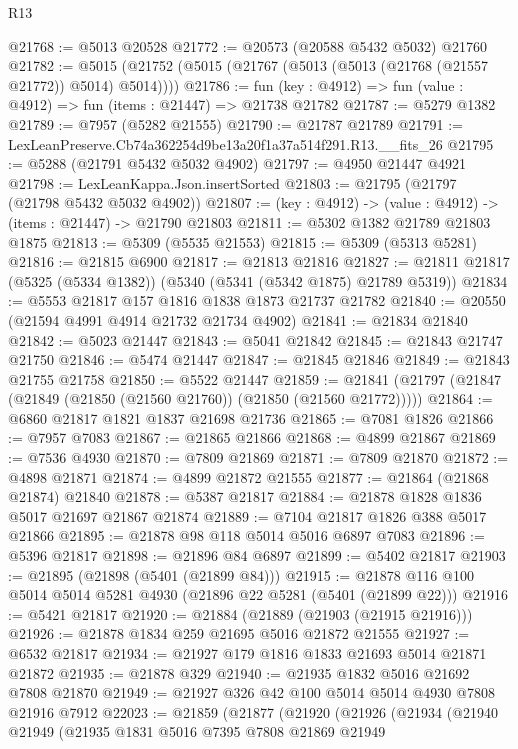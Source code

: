\begin{lexlean}{R13}
\begin{coremodule}
@21768 := @5013 @20528
@21772 := @20573 (@20588 @5432 @5032) @21760
@21782 := @5015 (@21752 (@5015 (@21767 (@5013 (@5013 (@21768 (@21557 @21772)) @5014) @5014))))
@21786 := fun (key : @4912) => fun (value : @4912) => fun (items : @21447) => @21738 @21782
@21787 := @5279 @1382
@21789 := @7957 (@5282 @21555)
@21790 := @21787 @21789
@21791 := LexLeanPreserve.Cb74a362254d9be13a20f1a37a514f291.R13.__fits_26
@21795 := @5288 (@21791 @5432 @5032 @4902)
@21797 := @4950 @21447 @4921
@21798 := LexLeanKappa.Json.insertSorted
@21803 := @21795 (@21797 (@21798 @5432 @5032 @4902))
@21807 := (key : @4912) -> (value : @4912) -> (items : @21447) -> @21790 @21803
@21811 := @5302 @1382 @21789 @21803 @1875
@21813 := @5309 (@5535 @21553)
@21815 := @5309 (@5313 @5281)
@21816 := @21815 @6900
@21817 := @21813 @21816
@21827 := @21811 @21817 (@5325 (@5334 @1382)) (@5340 (@5341 (@5342 @1875) @21789 @5319))
@21834 := @5553 @21817 @157 @1816 @1838 @1873 @21737 @21782
@21840 := @20550 (@21594 @4991 @4914 @21732 @21734 @4902)
@21841 := @21834 @21840
@21842 := @5023 @21447
@21843 := @5041 @21842
@21845 := @21843 @21747 @21750
@21846 := @5474 @21447
@21847 := @21845 @21846
@21849 := @21843 @21755 @21758
@21850 := @5522 @21447
@21859 := @21841 (@21797 (@21847 (@21849 (@21850 (@21560 @21760)) (@21850 (@21560 @21772)))))
@21864 := @6860 @21817 @1821 @1837 @21698 @21736
@21865 := @7081 @1826
@21866 := @7957 @7083
@21867 := @21865 @21866
@21868 := @4899 @21867
@21869 := @7536 @4930
@21870 := @7809 @21869
@21871 := @7809 @21870
@21872 := @4898 @21871
@21874 := @4899 @21872 @21555
@21877 := @21864 (@21868 @21874) @21840
@21878 := @5387 @21817
@21884 := @21878 @1828 @1836 @5017 @21697 @21867 @21874
@21889 := @7104 @21817 @1826 @388 @5017 @21866
@21895 := @21878 @98 @118 @5014 @5016 @6897 @7083
@21896 := @5396 @21817
@21898 := @21896 @84 @6897
@21899 := @5402 @21817
@21903 := @21895 (@21898 (@5401 (@21899 @84)))
@21915 := @21878 @116 @100 @5014 @5014 @5281 @4930 (@21896 @22 @5281 (@5401 (@21899 @22)))
@21916 := @5421 @21817
@21920 := @21884 (@21889 (@21903 (@21915 @21916)))
@21926 := @21878 @1834 @259 @21695 @5016 @21872 @21555
@21927 := @6532 @21817
@21934 := @21927 @179 @1816 @1833 @21693 @5014 @21871 @21872
@21935 := @21878 @329
@21940 := @21935 @1832 @5016 @21692 @7808 @21870
@21949 := @21927 @326 @42 @100 @5014 @5014 @4930 @7808 @21916 @7912
@22023 := @21859
    (@21877
      (@21920
        (@21926
          (@21934
            (@21940
              @21949
              (@21935
                @1831
                @5016
                @7395
                @7808
                @21869
                @21949

\end{coremodule}
\end{lexlean}
